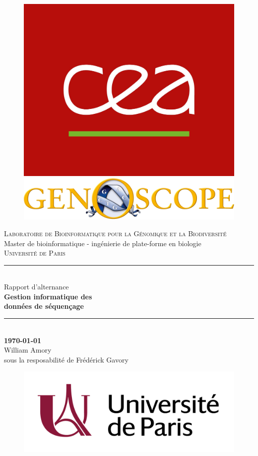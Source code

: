 \begin{titlepage}

    \newcommand{\HRule}{\rule{\linewidth}{0.5mm}} %
  
    \begin{figure}[ht!]
        \includegraphics[width=0.15\linewidth]{img/cea.jpg}
        \hspace{6cm}
        \includegraphics[width=0.5\linewidth]{img/genoscope_logo.png}
    \end{figure}
    \vspace{1cm}
  
    \begin{center}
  
        \textsc{\LARGE Laboratoire de Bioinformatique pour la Génomique et la Biodiversité}\\[1cm]
        \Large{ Master de bioinformatique - ingénierie de plate-forme en biologie \\ \textsc{Université de Paris}}\\[0.2cm]
  
  
        \vspace{1cm}
        \HRule \\[0.4cm]
        {\huge Rapport d'alternance}\\[0.2cm]
        {\Huge \bfseries Gestion informatique des \\ données de séquençage}\\
        \HRule \\[1cm]

        \LARGE{\textbf{\today}} \\[1cm]

        \LARGE{William Amory}\\
        \LARGE{sous la resposabilité de Frédérick Gavory}\\[1cm]
    
    \end{center}
  
    \begin{figure}[ht!]
        \includegraphics[width=0.4\linewidth]{img/logo}
    \end{figure}
    \newpage
  
\end{titlepage}